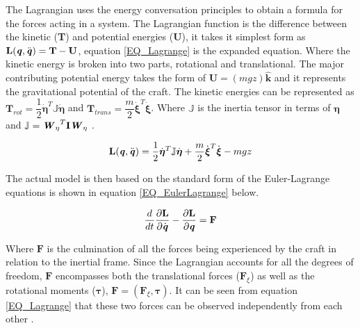 		The Lagrangian uses the energy conversation principles to obtain a formula for the forces acting in a system. The Lagrangian function is the difference between the kinetic (\textbf{T}) and potential energies (\textbf{U}), it takes it simplest form as $ \textbf{L}( \textbf{\textit{q}}, \ddot{ \textbf{\textit{q}}}) = \textbf{T} - \textbf{U}$, equation \eqref{EQ_Lagrange} is the expanded equation. 
		Where the kinetic energy is broken into two parts, rotational and translational. The major contributing potential energy takes the form of $\textbf{U} = (mgz) \hat{\textbf{k}}$ and it represents the gravitational potential of the craft. The kinetic energies can be represented as $\textbf{T}_{rot} = \dfrac{1}{2} \dot{\boldsymbol{\eta}}^T \mathbb{J} \dot{\boldsymbol{\eta}}$ and $\textbf{T}_{trans} = \dfrac{m}{2} \dot{\boldsymbol{\xi}}^T \dot{\boldsymbol{\xi}}$. Where $\mathbb{J}$ is the inertia tensor in terms of $\boldsymbol{\eta}$ and $\mathbb{J} = {\textbf{\textit{W}}_\eta}^T \textbf{I} \textbf{\textit{W}}_\eta$ \cite{Luukkonen, Modelling}.
		
		\begin{eqnarray}
		\textbf{L}( \textbf{\textit{q}}, \ddot{\textbf{\textit{q}}}) =  \dfrac{1}{2} \dot{\boldsymbol{\eta}}^T \mathbb{J} \dot{\boldsymbol{\eta}} + \dfrac{m}{2} \dot{\boldsymbol{\xi}}^T \dot{\boldsymbol{\xi}} - mgz
		\label{EQ_Lagrange}
		\end{eqnarray}
		
		The actual model is then based on the standard form of the Euler-Lagrange equations is shown in equation \eqref{EQ_EulerLagrange} below.
		
		\begin{equation}
		\dfrac{d}{dt} \dfrac{\partial \textbf{L}}{\partial \dot{\textbf{\textit{q}}}} -  \dfrac{\partial \textbf{L}}{\partial \textbf{\textit{q}}}= \textbf{F}
		\label{EQ_EulerLagrange}
		\end{equation}
		
		Where $\textbf{F}$ is the culmination of all the forces being experienced by the craft in relation to the inertial frame. Since the Lagrangian accounts for all the degrees of freedom, $\textbf{F}$ encompasses both the translational forces ($\textbf{F}_\xi$) as well as the rotational moments ($\boldsymbol{\tau}$), $\textbf{F} = (\textbf{F}_\xi, \boldsymbol{\tau})$. It can be seen from equation \eqref{EQ_Lagrange} that these two forces can be observed independently from each other \cite{RealTime}.
		
